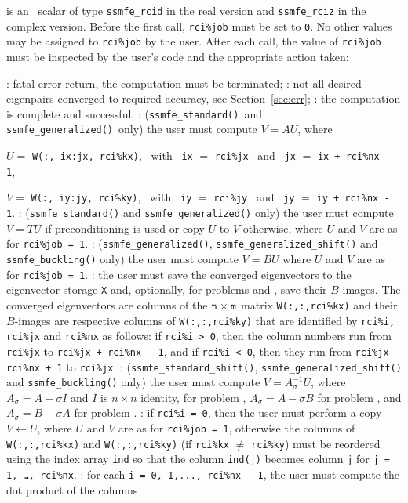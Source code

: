 \begin{description}
%
 is an \intentinout\ scalar  of type
{\tt ssmfe\_rcid} in the real version and
{\tt ssmfe\_rciz} in the complex version.
Before the first call, {\tt rci\%job} must be set to {\tt 0}.
No other values may be assigned to {\tt rci\%job} by the user.
After each call,
the value of {\tt rci\%job} must be inspected by the user's code
and the appropriate action taken: 
\begin{description}
%
: fatal error return, the computation must be terminated;
%
: 
not all desired eigenpairs converged to required accuracy,
see Section~\ref{sec:err}; 
%
: the computation is complete and successful.
%
:
({\tt ssmfe\_standard()}\ and {\tt ssmfe\_generalized()}\ only)
the user must compute $V = A U$, where

\hspace{8mm}
$U=$ {\tt W(:, ix:jx, rci\%kx)}, 
~with~ {\tt ix} $=$ {\tt rci\%jx} 
~and~
{\tt jx} $=$ {\tt ix + rci\%nx - 1},

\hspace{8mm}
$V=$ {\tt W(:, iy:jy, rci\%ky)},
~with~ {\tt iy} $=$ {\tt rci\%jy} 
~and~
{\tt jy} $=$ {\tt iy + rci\%nx - 1}.
%
:
({\tt ssmfe\_standard()} and {\tt ssmfe\_generalized()} only)
the user must
compute $V = T U$ if preconditioning is used
or copy $U$ to $V$ otherwise,
where $U$ and $V$ are as for {\tt rci\%job = 1}.
%
:
({\tt ssmfe\_generalized()}, {\tt ssmfe\_generalized\_shift()} 
and {\tt ssmfe\_buckling()} only)
the user must compute $V = B U$ 
where $U$ and $V$ are as for {\tt rci\%job = 1}.
%
: the user must save the converged eigenvectors
to the eigenvector storage {\tt X}
and, optionally, 
for problems  and ,
save their $B$-images.
The converged eigenvectors are columns of the ${\tt n}\times {\tt m}$ matrix
{\tt W(:,:,rci\%kx)} and their $B$-images are respective columns of
{\tt W(:,:,rci\%ky)}
that are identified by
{\tt rci\%i, rci\%jx} and {\tt rci\%nx}
as follows:
if {\tt rci\%i > 0}, then the column numbers
run from {\tt rci\%jx} to {\tt rci\%jx + rci\%nx - 1},
and if {\tt rci\%i < 0}, then they run
from {\tt rci\%jx - rci\%nx + 1} to {\tt rci\%jx}.
%
:
({\tt ssmfe\_standard\_shift()}, {\tt ssmfe\_generalized\_shift()}
and {\tt ssmfe\_buckling()} only)
the user must compute $V = A_\sigma^{-1} U$, where
$A_\sigma = A - \sigma I$
and $I$ is $n\times n$ identity,
for problem , 
$A_\sigma = A - \sigma B$ for problem ,
and 
$A_\sigma = B - \sigma A$ for problem .
%
:
if {\tt rci\%i = 0}, then
the user  must perform a copy $V \leftarrow U$, 
where $U$ and $V$ are as for {\tt rci\%job = 1},
otherwise the columns of {\tt W(:,:,rci\%kx)}
and {\tt W(:,:,rci\%ky)}
(if {\tt rci\%kx} $\not=$ {\tt rci\%ky}) 
must be reordered using
the index array {\tt ind} so that %
the column {\tt ind(j)} becomes column {\tt j}
for {\tt j = 1, \ldots, rci\%nx}.
%
:
for each
{\tt i = 0, 1,..., rci\%nx - 1}, 
the user must compute the dot product of
the columns 


\end{description}
\end{description}
